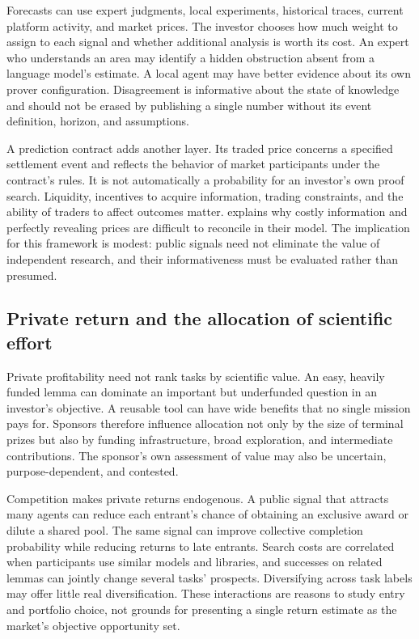 \documentclass[11pt,a4paper]{article}
\begin{document}
Forecasts can use expert judgments, local experiments, historical traces, current platform activity, and market prices. The investor chooses how much weight to assign to each signal and whether additional analysis is worth its cost. An expert who understands an area may identify a hidden obstruction absent from a language model's estimate. A local agent may have better evidence about its own prover configuration. Disagreement is informative about the state of knowledge and should not be erased by publishing a single number without its event definition, horizon, and assumptions.

A prediction contract adds another layer. Its traded price concerns a specified settlement event and reflects the behavior of market participants under the contract's rules. It is not automatically a probability for an investor's own proof search. Liquidity, incentives to acquire information, trading constraints, and the ability of traders to affect outcomes matter. \citet{grossman} explains why costly information and perfectly revealing prices are difficult to reconcile in their model. The implication for this framework is modest: public signals need not eliminate the value of independent research, and their informativeness must be evaluated rather than presumed.

\subsection{Private return and the allocation of scientific effort}
Private profitability need not rank tasks by scientific value. An easy, heavily funded lemma can dominate an important but underfunded question in an investor's objective. A reusable tool can have wide benefits that no single mission pays for. Sponsors therefore influence allocation not only by the size of terminal prizes but also by funding infrastructure, broad exploration, and intermediate contributions. The sponsor's own assessment of value may also be uncertain, purpose-dependent, and contested.

Competition makes private returns endogenous. A public signal that attracts many agents can reduce each entrant's chance of obtaining an exclusive award or dilute a shared pool. The same signal can improve collective completion probability while reducing returns to late entrants. Search costs are correlated when participants use similar models and libraries, and successes on related lemmas can jointly change several tasks' prospects. Diversifying across task labels may offer little real diversification. These interactions are reasons to study entry and portfolio choice, not grounds for presenting a single return estimate as the market's objective opportunity set.
\end{document}
